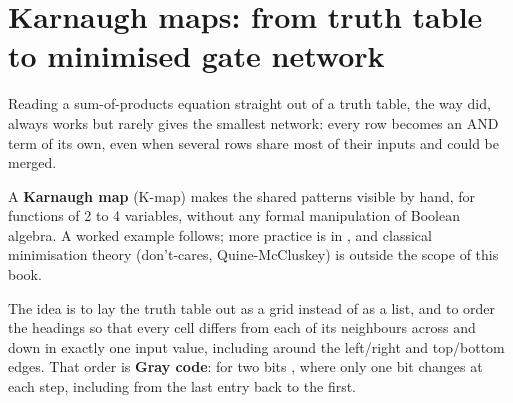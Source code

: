 
\section{Karnaugh maps: from truth table to minimised gate network}
\label{c2:sec:kmap}

Reading a sum-of-products equation straight out of a truth table, the way 
did, always works but rarely gives the smallest network: every  row becomes an AND term of
its own, even when several rows share most of their inputs and could be merged.

A \textbf{Karnaugh map} (K-map) makes the shared patterns visible by hand, for functions of 2 to 4
variables, without any formal manipulation of Boolean algebra. A worked example follows; more
practice is in , and classical minimisation theory (don't-cares,
Quine\--McCluskey) is outside the scope of this book.

The idea is to lay the truth table out as a grid instead of as a list, and to order the headings so
that every cell differs from each of its neighbours across and down in exactly one input value,
including around the left/right and top/bottom edges. That order is \textbf{Gray code}: for two
bits , where only one bit changes at each step, including from the last entry
back to the first.

